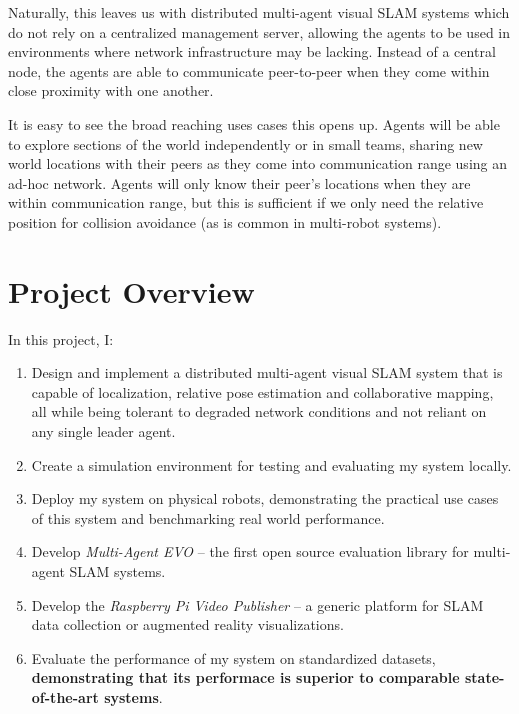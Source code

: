 Naturally, this leaves us with distributed multi-agent visual SLAM systems which do not rely on a centralized management server, allowing the agents to be used in environments where network infrastructure may be lacking. Instead of a central node, the agents are able to communicate peer-to-peer when they come within close proximity with one another.

It is easy to see the broad reaching uses cases this opens up. Agents will be able to explore sections of the world independently or in small teams, sharing new world locations with their peers as they come into communication range using an ad-hoc network. Agents will only know their peer's locations when they are within communication range, but this is sufficient if we only need the relative position for collision avoidance (as is common in multi-robot systems).

\section{Project Overview}
\label{sec:project-overview}
In this project, I: \noparskip
{
    \begin{enumerate}
        \item Design and implement a distributed multi-agent visual SLAM system that is capable of localization, relative pose estimation and  collaborative mapping, all while being tolerant to degraded network conditions and not reliant on any single leader agent.
        \item Create a simulation environment for testing and evaluating my system locally.
        \item Deploy my system on physical robots, demonstrating the practical use cases of this system and benchmarking real world performance.
        \item Develop \textit{Multi-Agent EVO} – the first open source evaluation library for multi-agent SLAM systems.
        \item Develop the \textit{Raspberry Pi Video Publisher} – a generic platform for SLAM data collection or augmented reality visualizations.
        \item Evaluate the performance of my system on standardized datasets, \textbf{demonstrating that its performace is superior to comparable state-of-the-art systems}.
    \end{enumerate}
}
